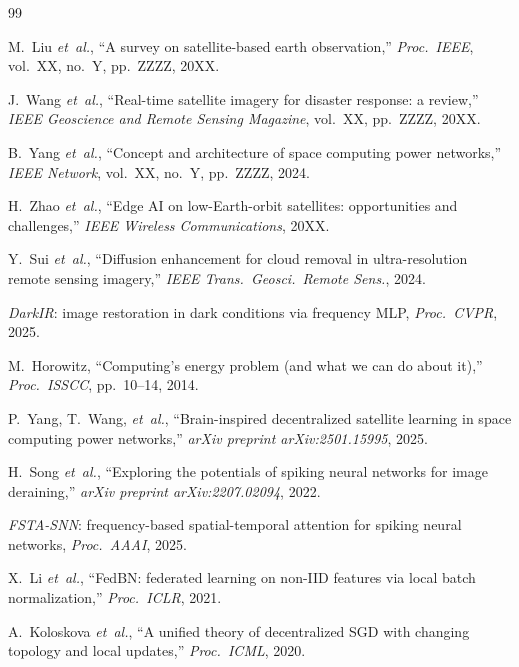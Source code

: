 \documentclass[conference]{IEEEtran}
\begin{document}

\begin{thebibliography}{99}

M.~Liu \emph{et~al.},
``A survey on satellite-based earth observation,''
\emph{Proc.~IEEE}, vol.~XX, no.~Y, pp.~ZZZZ, 20XX.

J.~Wang \emph{et~al.},
``Real-time satellite imagery for disaster response: a review,''
\emph{IEEE Geoscience and Remote Sensing Magazine},
vol.~XX, pp.~ZZZZ, 20XX.

B.~Yang \emph{et~al.},
``Concept and architecture of space computing power networks,''
\emph{IEEE Network}, vol.~XX, no.~Y, pp.~ZZZZ, 2024.

H.~Zhao \emph{et~al.},
``Edge AI on low-Earth-orbit satellites: opportunities and
challenges,''
\emph{IEEE Wireless Communications}, 20XX.

Y.~Sui \emph{et~al.},
``Diffusion enhancement for cloud removal in ultra-resolution remote
sensing imagery,''
\emph{IEEE Trans.\ Geosci.\ Remote Sens.}, 2024.

\emph{DarkIR}: image restoration in dark conditions via frequency MLP,
\emph{Proc.~CVPR}, 2025.

M.~Horowitz,
``Computing's energy problem (and what we can do about it),''
\emph{Proc.~ISSCC}, pp.~10--14, 2014.

P.~Yang, T.~Wang, \emph{et~al.},
``Brain-inspired decentralized satellite learning in space computing
power networks,''
\emph{arXiv preprint arXiv:2501.15995}, 2025.

H.~Song \emph{et~al.},
``Exploring the potentials of spiking neural networks for image
deraining,''
\emph{arXiv preprint arXiv:2207.02094}, 2022.

\emph{FSTA-SNN}: frequency-based spatial-temporal attention for spiking
neural networks,
\emph{Proc.~AAAI}, 2025.

X.~Li \emph{et~al.},
``FedBN: federated learning on non-IID features via local batch
normalization,''
\emph{Proc.~ICLR}, 2021.

A.~Koloskova \emph{et~al.},
``A unified theory of decentralized SGD with changing topology and
local updates,''
\emph{Proc.~ICML}, 2020.


\end{thebibliography}
\end{document}
